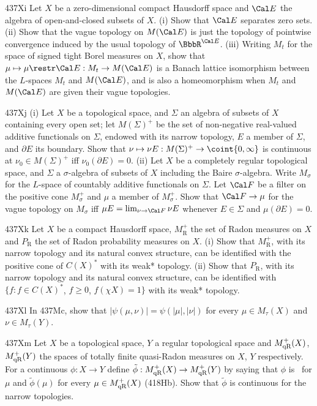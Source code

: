 {\sqheader 437Xi Let $X$ be a zero-dimensional compact Hausdorff
space and $\Cal E$ the algebra of open-and-closed subsets of $X$.   (i)
Show that $\Cal E$ separates
zero sets.   (ii) Show that the vague topology on $M(\Cal E)$ is just
the topology of pointwise convergence induced by the usual topology of
$\BbbR^{\Cal E}$.
(iii) Writing $M_t$ for the space of signed tight Borel measures on $X$,
show that $\mu\mapsto\mu\restr\Cal E:M_t\to M(\Cal E)$ is a Banach
lattice isomorphism
between the $L$-spaces $M_t$ and $M(\Cal E)$, and is also a
homeomorphism when $M_t$ and $M(\Cal E)$ are given their vague
topologies.

\spheader 437Xj
(i) Let $X$ be a topological space, and $\Sigma$ an algebra of
subsets of $X$ containing every open set;  let $M(\Sigma)^+$ be the set of
non-negative real-valued additive functionals on $\Sigma$, endowed with its
narrow topology, $E$ a member
of $\Sigma$, and $\partial E$ its boundary.
Show that $\nu\mapsto\nu E:M(\Sigma)^+\to\coint{0,\infty}$
is continuous at $\nu_0\in M(\Sigma)^+$ iff $\nu_0(\partial E)=0$.
(ii) Let $X$ be a completely regular topological space, and $\Sigma$ a
$\sigma$-algebra of subsets of $X$ including the Baire $\sigma$-algebra.
Write $M_{\sigma}$ for the $L$-space of countably additive functionals on
$\Sigma$.   Let $\Cal F$ be a filter on the positive cone $M_{\sigma}^+$
and $\mu$ a member of $M_{\sigma}^+$.
Show that $\Cal F\to\mu$ for the vague topology on $M_{\sigma}$ iff
$\mu E=\lim_{\nu\to\Cal F}\nu E$ whenever $E\in\Sigma$ and
$\mu(\partial E)=0$.

\spheader 437Xk
Let $X$ be a compact Hausdorff space, $M^+_{\text{R}}$
the set of Radon measures on $X$ and $P_{\text{R}}$ the set of Radon
probability measures on $X$.
(i) Show that $M^+_{\text{R}}$, with its narrow
topology and its natural convex structure,
can be identified with the positive cone of $C(X)^*$ with its
weak* topology.
(ii) Show that $P_{\text{R}}$, with its narrow
topology and its natural convex structure, can be identified with
$\{f:f\in C(X)^*$, $f\ge 0$, $f(\chi X)=1\}$ with its weak* topology.

\spheader 437Xl In 437Mc, show that $|\psi(\mu,\nu)|=\psi(|\mu|,|\nu|)$
for every $\mu\in M_{\tau}(X)$ and $\nu\in M_{\tau}(Y)$.

\spheader 437Xm Let $X$ be a topological space, $Y$ a regular
topological space and $M^+_{\text{qR}}(X)$, $M^+_{\text{qR}}(Y)$ the spaces of totally finite
quasi-Radon measures on $X$, $Y$ respectively.   For a continuous
$\phi:X\to Y$ define $\tilde\phi:M^+_{\text{qR}}(X)\to M^+_{\text{qR}}(Y)$ by saying that $\phi$
is \imp\ for $\mu$ and $\tilde\phi(\mu)$ for every $\mu\in M^+_{\text{qR}}(X)$ (418Hb).
Show that $\tilde\phi$ is continuous for the narrow topologies.

}
